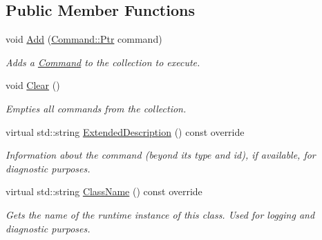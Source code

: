 \subsection*{Public Member Functions}
\begin{DoxyCompactItemize}
\item 
void \mbox{\hyperlink{class_command_lib_1_1_parallel_commands_a36085841c237794fc8015ed400e552ad}{Add}} (\mbox{\hyperlink{class_command_lib_1_1_command_a3b3e4f00144373299df5c6bb1acc319d}{Command\+::\+Ptr}} command)
\begin{DoxyCompactList}\small\item\em Adds a \mbox{\hyperlink{class_command_lib_1_1_command}{Command}} to the collection to execute.\end{DoxyCompactList}\item 
void \mbox{\hyperlink{class_command_lib_1_1_parallel_commands_aba3f6e3abd06e1483c640eb6d9a82788}{Clear}} ()
\begin{DoxyCompactList}\small\item\em Empties all commands from the collection.\end{DoxyCompactList}\item 
\mbox{\label{class_command_lib_1_1_parallel_commands_a5c079ef465fe007bc3b8e893554c5610}} 
virtual std\+::string \mbox{\hyperlink{class_command_lib_1_1_parallel_commands_a5c079ef465fe007bc3b8e893554c5610}{Extended\+Description}} () const override
\begin{DoxyCompactList}\small\item\em Information about the command (beyond its type and id), if available, for diagnostic purposes.  \end{DoxyCompactList}\item 
\mbox{\label{class_command_lib_1_1_parallel_commands_aada3d28f970e82d1d057ac2b499453ac}} 
virtual std\+::string \mbox{\hyperlink{class_command_lib_1_1_parallel_commands_aada3d28f970e82d1d057ac2b499453ac}{Class\+Name}} () const override
\begin{DoxyCompactList}\small\item\em Gets the name of the runtime instance of this class. Used for logging and diagnostic purposes.  \end{DoxyCompactList}\end{DoxyCompactItemize}
